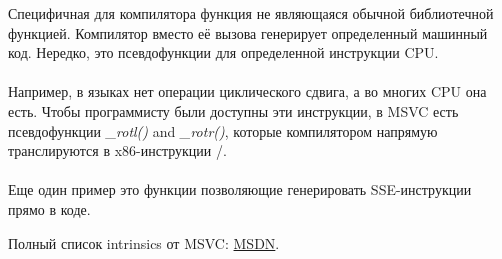 \label{sec:compiler_intrinsic}

Специфичная для компилятора функция не являющаяся обычной библиотечной функцией.
Компилятор вместо её вызова генерирует определенный машинный код.
Нередко, это псевдофункции для определенной инструкции \ac{CPU}. \\
\\
Например, в языках \CCpp нет операции циклического сдвига, а во многих \ac{CPU} она есть.
Чтобы программисту были доступны эти инструкции, в MSVC есть псевдофункции 
\emph{\_rotl()} and \emph{\_rotr()}\FNMSDNROTxURL{},
которые компилятором напрямую транслируются в x86-инструкции /. \\
\\
Еще один пример это функции позволяющие генерировать SSE-инструкции прямо в коде.

Полный список intrinsics от MSVC: \href{http://msdn.microsoft.com/en-us/library/26td21ds.aspx}{MSDN}.

